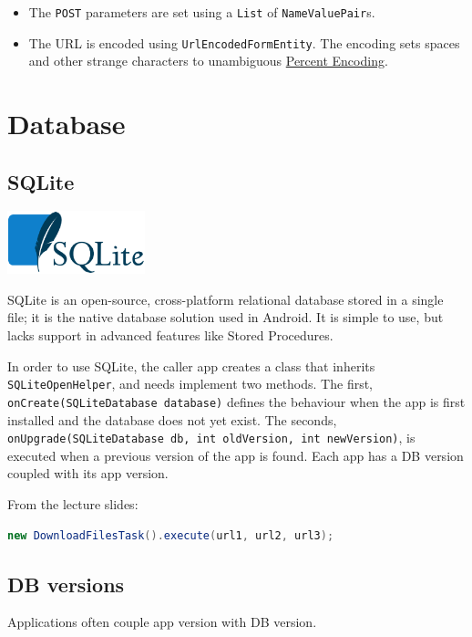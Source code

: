 \documentclass{article}
\def\cw#1{\texttt{#1}}
\begin{document}
\begin{itemize}
\item{The \cw{POST} parameters are set using a \cw{List} of \cw{NameValuePair}s. }
\item{The URL is encoded using \cw{UrlEncodedFormEntity}. The encoding sets spaces and other strange characters to unambiguous  \href{http://en.wikipedia.org/wiki/Percent-encoding}{Percent Encoding}. }
\end{itemize}

\section{Database}
\subsection{SQLite}

\begin{center}
\includegraphics[width=0.3\textwidth]{img/sqlite_logo_wikipedia.eps}
\end{center}

SQLite is an open-source, cross-platform relational database stored in a single file; it is the native database solution used in Android. It is simple to use, but lacks support in advanced features like Stored Procedures.

 In order to use SQLite, the caller app creates a class that inherits \cw{SQLiteOpenHelper}, and needs implement two methods. The first, \cw{onCreate(SQLiteDatabase database)} defines the behaviour when the app is first installed and the database does not yet exist. The seconds, \cw{onUpgrade(SQLiteDatabase db, int oldVersion, int newVersion)}, is executed when a previous version of the app is found. Each app has a DB version coupled with its app version.

From the lecture slides:

\begin{code} \begin{lstlisting}[language=Java]
new DownloadFilesTask().execute(url1, url2, url3);
\end{lstlisting} \end{code}



\subsection{DB versions}

Applications often couple app version with DB version.
\end{document}
